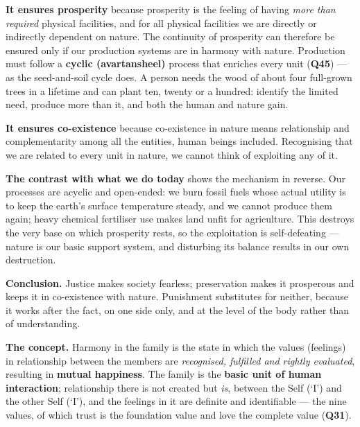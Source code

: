 \begin{abul}
\item \textbf{It ensures prosperity} because prosperity is the feeling of
      having \emph{more than required} physical facilities, and for all
      physical facilities we are directly or indirectly dependent on nature.
      The continuity of prosperity can therefore be ensured only if our
      production systems are in harmony with nature. Production must follow a
      \textbf{cyclic (avartansheel)} process that enriches every unit
      (\textbf{Q45}) --- as the seed-and-soil cycle does. A person needs the
      wood of about four full-grown trees in a lifetime and can plant ten,
      twenty or a hundred: identify the limited need, produce more than it,
      and both the human and nature gain.
\item \textbf{It ensures co-existence} because co-existence in nature means
      relationship and complementarity among all the entities, human beings
      included. Recognising that we are related to every unit in nature, we
      cannot think of exploiting any of it.
\item \textbf{The contrast with what we do today} shows the mechanism in
      reverse. Our processes are acyclic and open-ended: we burn fossil fuels
      whose actual utility is to keep the earth's surface temperature steady,
      and we cannot produce them again; heavy chemical fertiliser use makes
      land unfit for agriculture. This destroys the very base on which
      prosperity rests, so the exploitation is self-defeating --- nature is
      our basic support system, and disturbing its balance results in our own
      destruction.
\end{abul}

\textbf{Conclusion.} Justice makes society fearless; preservation makes it
prosperous and keeps it in co-existence with nature. Punishment substitutes
for neither, because it works after the fact, on one side only, and at the
level of the body rather than of understanding.


\ans \textbf{The concept.} Harmony in the family is the state in which the
values (feelings) in relationship between the members are \emph{recognised,
fulfilled and rightly evaluated}, resulting in \textbf{mutual happiness}. The
family is the \textbf{basic unit of human interaction}; relationship there is
not created but \emph{is}, between the Self (`I') and the other Self (`I'),
and the feelings in it are definite and identifiable --- the nine values, of
which trust is the foundation value and love the complete value
(\textbf{Q31}).

